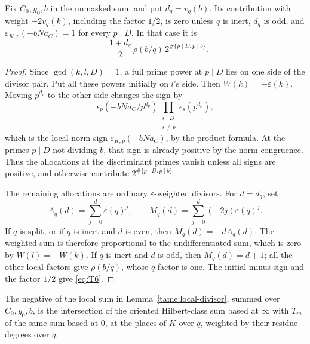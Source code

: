 \begin{lemma}\label{tame:local-divisor}
Fix \(C_0,y_0,b\) in the unmasked sum, and put \(d_q=v_q(b)\).
Its contribution with weight \(-2v_q(k)\), including the factor
\(1/2\), is zero unless \(q\) is inert, \(d_q\) is odd, and
\(\varepsilon_{K,p}(-bNa_C)=1\) for every \(p\mid D\).
In that case it is
\[
 -\frac{1+d_q}{2}\,\rho(b/q)\,
       2^{\#\{p\mid D:p\mid b\}}.
 \tag{T6}\label{eq:T6}
\]
\end{lemma}

\begin{proof}
Since \(\gcd(k,l,D)=1\), a full prime power at \(p\mid D\)
lies on one side of the divisor pair. Put all these powers
initially on \(l\)'s side. Then \(W(k)=-\varepsilon(k)\).
Moving \(p^{d_p}\) to the other side changes the sign by
\[
 \epsilon_p(-bNa_C/p^{d_p})
     \prod_{\substack{s\mid D\\s\ne p}}\epsilon_s(p^{d_p}),
\]
which is the local norm sign \(\varepsilon_{K,p}(-bNa_C)\),
by the product formula. At the primes \(p\mid D\) not dividing
\(b\), that sign is already positive by the norm congruence.
Thus the allocations at the discriminant primes vanish unless
all signs are positive, and otherwise contribute
\(2^{\#\{p\mid D:p\mid b\}}\).

The remaining allocations are ordinary \(\varepsilon\)-weighted
divisors. For \(d=d_q\), set
\[
 A_q(d)=\sum_{j=0}^d\varepsilon(q)^j,\qquad
 M_q(d)=\sum_{j=0}^d(-2j)\varepsilon(q)^j.
\]
If \(q\) is split, or if \(q\) is inert and \(d\) is even, then
\(M_q(d)=-dA_q(d)\). The weighted sum is therefore proportional
to the undifferentiated sum, which is zero by \(W(l)=-W(k)\).
If \(q\) is inert and \(d\) is odd, then \(M_q(d)=d+1\);
all the other local factors give \(\rho(b/q)\), whose \(q\)-factor
is one. The initial minus sign and the factor \(1/2\) give
\eqref{eq:T6}.
\end{proof}

\begin{proposition}\label{tame:intersection}
The negative of the local sum in Lemma~\ref{tame:local-divisor},
summed over \(C_0,y_0,b\), is the intersection of the oriented
Hilbert-class sum based at \(\infty\) with \(T_m\) of the same
sum based at \(0\), at the places of \(K\) over \(q\), weighted
by their residue degrees over \(q\).
\end{proposition}

